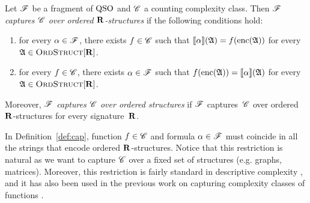 \begin{definition} \label{def:cap}
	Let $\mathscr{F}$ be a fragment of ${\rm QSO}$ and $\mathscr{C}$ a counting complexity class. Then {\em  $\mathscr{F}$ captures $\mathscr{C}$ over ordered $\mathbf{R}$-structures} if the  following conditions hold:
	\begin{enumerate}
		\item for every $\alpha \in \mathscr{F}$, there exists $f \in \mathscr{C}$ such that ${\llbracket{}{\alpha}\rrbracket}(\mathfrak{A}) = f({\rm enc}(\mathfrak{A}))$ for every $\mathfrak{A} \in \text{\sc OrdStruct}[\mathbf{R}]$. 
		
		\item for every $f \in \mathscr{C}$, there exists $\alpha \in \mathscr{F}$ such that   $f({\rm enc}(\mathfrak{A})) = {\llbracket{}{\alpha}\rrbracket}(\mathfrak{A})$ for every $\mathfrak{A} \in \text{\sc OrdStruct}[\mathbf{R}]$.
	\end{enumerate} 
	Moreover, {\em $\mathscr{F}$ captures $\mathscr{C}$ over ordered structures} if $\mathscr{F}$ captures~$\mathscr{C}$ over ordered $\mathbf{R}$-structures for every signature~$\mathbf{R}$.
\end{definition}
In Definition~\ref{def:cap}, function $f \in \mathscr{C}$ and formula $\alpha \in \mathscr{F}$ must coincide in all the strings that encode ordered $\mathbf{R}$-structures. Notice that this restriction is natural as we want to capture %
$\mathscr{C}$ over a fixed set of structures (e.g. graphs, matrices).
Moreover, this restriction is fairly standard in descriptive complexity \cite{immerman1999descriptive,L04}, and it has also been used in the previous work on capturing complexity classes of functions \cite{SalujaST95,ComptonG96}.


